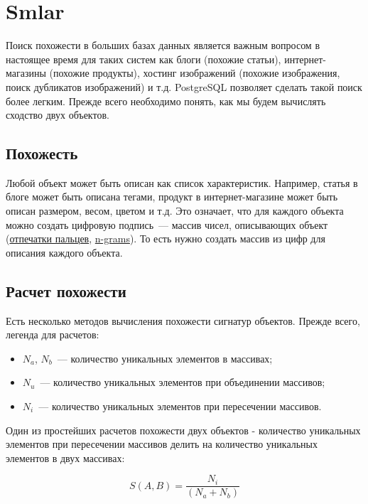 \section{Smlar}

Поиск похожести в больших базах данных является важным вопросом в настоящее время для таких систем как блоги (похожие статьи), интернет-магазины (похожие продукты), хостинг изображений (похожие изображения, поиск дубликатов изображений) и т.д. PostgreSQL позволяет сделать такой поиск более легким. Прежде всего необходимо понять, как мы будем вычислять сходство двух объектов.

\subsection{Похожесть}

Любой объект может быть описан как список характеристик. Например, статья в блоге может быть описана тегами, продукт в интернет-магазине может быть описан размером, весом, цветом и т.д. Это означает, что для каждого объекта можно создать цифровую подпись~--- массив чисел, описывающих объект (\href{http://en.wikipedia.org/wiki/Fingerprint}{отпечатки пальцев}, \href{http://en.wikipedia.org/wiki/N-gram}{n-grams}). То есть нужно создать массив из цифр для описания каждого объекта.

\subsection{Расчет похожести}

Есть несколько методов вычисления похожести сигнатур объектов. Прежде всего, легенда для расчетов:

\begin{itemize}
  \item $N_a$, $N_b$~--- количество уникальных элементов в массивах;
  \item $N_u$~--- количество уникальных элементов при объединении массивов;
  \item $N_i$~--- количество уникальных элементов при пересечении массивов.
\end{itemize}

Один из простейших расчетов похожести двух объектов - количество уникальных элементов при пересечении массивов делить на количество уникальных элементов в двух массивах:

\begin{equation}
 \label{eq:smlar1}
 S(A,B) = \frac{N_{i}}{(N_{a}+N_{b})}
\end{equation}

